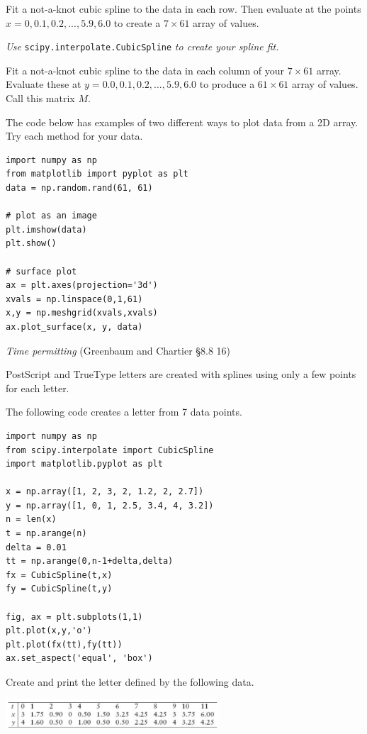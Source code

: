 \documentclass[12pt,letterpaper,noanswers]{exam}
\begin{document}
\begin{questions}
\begin{parts}
\item Fit a not-a-knot cubic spline to the data in each row.  Then evaluate at the points $x = 0,0.1,0.2,...,5.9,6.0$ to create a $7\times 61$ array of values.

\emph{Use} \texttt{scipy.interpolate.CubicSpline} \emph{to create your spline fit.}
\item Fit a not-a-knot cubic spline to the data in each column of your $7\times 61$ array.  Evaluate these at $y = 0.0,0.1,0.2,...,5.9,6.0$ to produce a $61\times 61$ array of values.  Call this matrix $M$.
\item The code below has examples of two different ways to plot data from a 2D array.  Try each method for your data.
\begin{verbatim}
import numpy as np
from matplotlib import pyplot as plt
data = np.random.rand(61, 61)

# plot as an image
plt.imshow(data)
plt.show()

# surface plot
ax = plt.axes(projection='3d')
xvals = np.linspace(0,1,61)
x,y = np.meshgrid(xvals,xvals)
ax.plot_surface(x, y, data)
\end{verbatim}
\end{parts}


\item \emph{Time permitting} (Greenbaum and Chartier \S8.8 16)

PostScript and TrueType letters are created with splines using only a few points for each letter.  


The following code creates a letter from 7 data points.
\begin{verbatim}
import numpy as np
from scipy.interpolate import CubicSpline
import matplotlib.pyplot as plt

x = np.array([1, 2, 3, 2, 1.2, 2, 2.7])
y = np.array([1, 0, 1, 2.5, 3.4, 4, 3.2])
n = len(x)
t = np.arange(n)
delta = 0.01
tt = np.arange(0,n-1+delta,delta)
fx = CubicSpline(t,x)
fy = CubicSpline(t,y)

fig, ax = plt.subplots(1,1)
plt.plot(x,y,'o')
plt.plot(fx(tt),fy(tt))
ax.set_aspect('equal', 'box')    
\end{verbatim}

\begin{parts}
\item Create and print the letter defined by the following data.

\includegraphics[width=0.6\textwidth]{img/PSet05letterdata.png}


\end{parts}
\end{questions}
\end{document}
